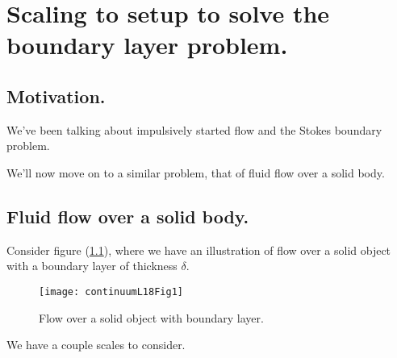 %
%

\chapter{Scaling to setup to solve the boundary layer problem.}
\label{chap:continuumL18}
{}
\date{Mar 21, 2012}

\beginArtWithToc

%

\section{Motivation.}

We've been talking about impulsively started flow and the Stokes boundary problem.

We'll now move on to a similar problem, that of fluid flow over a solid body.

\section{Fluid flow over a solid body.}

Consider figure (\ref{fig:continuumL18:continuumL18Fig1}), where we have an illustration of flow over a solid object with a boundary layer of thickness $\delta$.

\begin{figure}[htp]
   \centering
   \texttt{[image: continuumL18Fig1]}
   \caption{Flow over a solid object with boundary layer.}\label{fig:continuumL18:continuumL18Fig1}
\end{figure}

We have a couple scales to consider.

